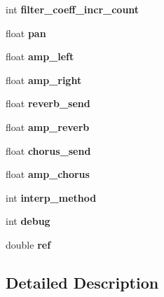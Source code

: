 \begin{DoxyCompactItemize}
\mbox{\label{class_fluid_s_1_1_voice_ae9f9986b163be58695d1c1ac29f0e9b7}} 
int {\bfseries filter\+\_\+coeff\+\_\+incr\+\_\+count}
\item 
\mbox{\label{class_fluid_s_1_1_voice_ae64672cbcf2a548985932c6dfd4cd23d}} 
float {\bfseries pan}
\item 
\mbox{\label{class_fluid_s_1_1_voice_a03ee1ae04f8c68541be5f00f72e8b53d}} 
float {\bfseries amp\+\_\+left}
\item 
\mbox{\label{class_fluid_s_1_1_voice_a6854829544035797c65b5b38124f183e}} 
float {\bfseries amp\+\_\+right}
\item 
\mbox{\label{class_fluid_s_1_1_voice_a297eda3a484890217d6acf6803e5836e}} 
float {\bfseries reverb\+\_\+send}
\item 
\mbox{\label{class_fluid_s_1_1_voice_aa5ed6a1714be5518517889369dc04eab}} 
float {\bfseries amp\+\_\+reverb}
\item 
\mbox{\label{class_fluid_s_1_1_voice_a325d2a04fc78c37304a16e72c8a5b24a}} 
float {\bfseries chorus\+\_\+send}
\item 
\mbox{\label{class_fluid_s_1_1_voice_a045df37c21abab195b905d7113fdaabb}} 
float {\bfseries amp\+\_\+chorus}
\item 
\mbox{\label{class_fluid_s_1_1_voice_a045edf6153559c10f1a23944034679ca}} 
int {\bfseries interp\+\_\+method}
\item 
\mbox{\label{class_fluid_s_1_1_voice_ac71c7c2680156834347931316852dc10}} 
int {\bfseries debug}
\item 
\mbox{\label{class_fluid_s_1_1_voice_a06c4669ea0c4c6c7aeb6c01d47318e97}} 
double {\bfseries ref}
\end{DoxyCompactItemize}


\subsection{Detailed Description}


